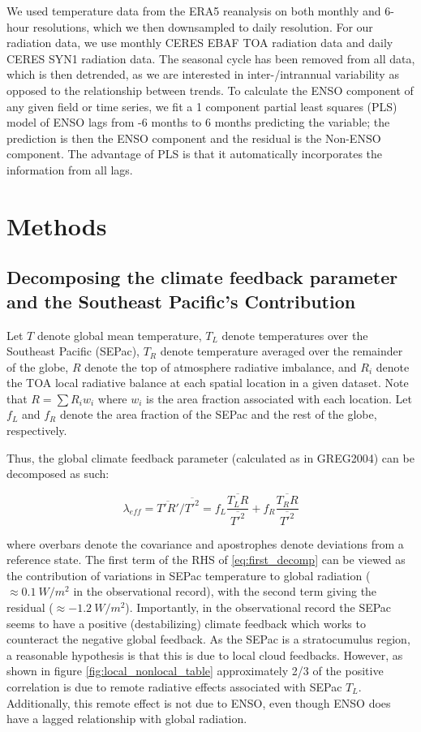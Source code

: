 \documentclass{article}
\begin{document}
We used temperature data from the ERA5 reanalysis on both monthly and 6-hour resolutions, which we then downsampled to daily resolution. For our radiation data, we use monthly CERES EBAF TOA radiation data and daily CERES SYN1 radiation data. The seasonal cycle has been removed from all data, which is then detrended, as we are interested in inter-/intrannual variability as opposed to the relationship between trends. To calculate the ENSO component of any given field or time series, we fit a 1 component partial least squares (PLS) model of ENSO lags from -6 months to 6 months predicting the variable; the prediction is then the ENSO component and the residual is the Non-ENSO component. The advantage of PLS is that it automatically incorporates the information from all lags.

\section{Methods}

\subsection{Decomposing the climate feedback parameter and the Southeast Pacific's Contribution}
    Let $T$ denote global mean temperature, $T_{L}$ denote temperatures over the Southeast Pacific (SEPac), $T_R$ denote temperature averaged over the remainder of the globe, $R$ denote the top of atmosphere radiative imbalance, and $R_i$ denote the TOA local radiative balance at each spatial location in a given dataset. Note that $R = \sum R_i w_i$ where $w_i$ is the area fraction associated with each location. Let $f_L$ and $f_R$ denote the area fraction of the SEPac and the rest of the globe, respectively.
    
    Thus, the global climate feedback parameter (calculated as in GREG2004) can be decomposed as such:

\begin{equation}
 \label{eq:first_decomp}
 \lambda_{eff} = \overline{T'R'}/\overline{T'^2} = f_L \frac{\overline{T_L R}}{\overline{T'^2}} + f_R \frac{\overline{T_R R}}{\overline{T'^2}}
\end{equation}

where overbars denote the covariance and apostrophes denote deviations from a reference state. The first term of the RHS of \ref{eq:first_decomp} can be viewed as the contribution of variations in SEPac temperature to global radiation ($\approx \qty{+0.1}{W/m^2}$ in the observational record), with the second term giving the residual ($\approx \qty{-1.2}{W/m^2}$). Importantly, in the observational record the SEPac seems to have a positive (destabilizing) climate feedback which works to counteract the negative global feedback. As the SEPac is a stratocumulus region, a reasonable hypothesis is that this is due to local cloud feedbacks. However, as shown in figure \ref{fig:local_nonlocal_table} approximately 2/3 of the positive correlation is due to remote radiative effects associated with SEPac $T_L$. Additionally, this remote effect is not due to ENSO, even though ENSO does have a lagged relationship with global radiation.
\end{document}
